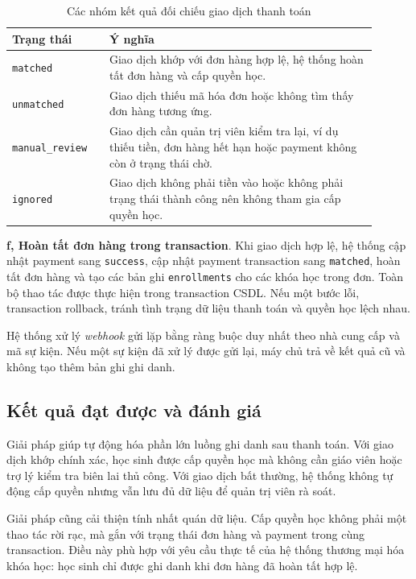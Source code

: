 \documentclass[../DoAn.tex]{subfiles}
\begin{document}
\begin{table}[H]
\centering
\caption{Các nhóm kết quả đối chiếu giao dịch thanh toán}
\label{table:payment_match_result}
\begin{tabular}{|p{0.24\linewidth}|p{0.66\linewidth}|}
\hline
\textbf{Trạng thái} & \textbf{Ý nghĩa} \\
\hline
\texttt{matched} & Giao dịch khớp với đơn hàng hợp lệ, hệ thống hoàn tất đơn hàng và cấp quyền học. \\
\hline
\texttt{unmatched} & Giao dịch thiếu mã hóa đơn hoặc không tìm thấy đơn hàng tương ứng. \\
\hline
\texttt{manual\_review} & Giao dịch cần quản trị viên kiểm tra lại, ví dụ thiếu tiền, đơn hàng hết hạn hoặc payment không còn ở trạng thái chờ. \\
\hline
\texttt{ignored} & Giao dịch không phải tiền vào hoặc không phải trạng thái thành công nên không tham gia cấp quyền học. \\
\hline
\end{tabular}
\end{table}

\textbf{f, Hoàn tất đơn hàng trong transaction}. Khi giao dịch hợp lệ, hệ thống cập nhật payment sang \texttt{success}, cập nhật payment transaction sang \texttt{matched}, hoàn tất đơn hàng và tạo các bản ghi \texttt{enrollments} cho các khóa học trong đơn. Toàn bộ thao tác được thực hiện trong transaction CSDL. Nếu một bước lỗi, transaction rollback, tránh tình trạng dữ liệu thanh toán và quyền học lệch nhau.

Hệ thống xử lý \textit{webhook} gửi lặp bằng ràng buộc duy nhất theo nhà cung cấp và mã sự kiện. Nếu một sự kiện đã xử lý được gửi lại, máy chủ trả về kết quả cũ và không tạo thêm bản ghi ghi danh.

\subsection{Kết quả đạt được và đánh giá}
\label{section:5.4.3}

Giải pháp giúp tự động hóa phần lớn luồng ghi danh sau thanh toán. Với giao dịch khớp chính xác, học sinh được cấp quyền học mà không cần giáo viên hoặc trợ lý kiểm tra biên lai thủ công. Với giao dịch bất thường, hệ thống không tự động cấp quyền nhưng vẫn lưu đủ dữ liệu để quản trị viên rà soát.

Giải pháp cũng cải thiện tính nhất quán dữ liệu. Cấp quyền học không phải một thao tác rời rạc, mà gắn với trạng thái đơn hàng và payment trong cùng transaction. Điều này phù hợp với yêu cầu thực tế của hệ thống thương mại hóa khóa học: học sinh chỉ được ghi danh khi đơn hàng đã hoàn tất hợp lệ.
\end{document}
